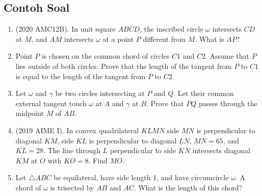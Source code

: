 \documentclass[11pt]{scrartcl}
\begin{document}
\subsection{Contoh Soal}
\begin{enumerate}
    \item (2020 AMC12B). In unit square $ABCD$, the inscribed circle $\omega$ intersects $CD$ at $M$, and $AM$ intersects $\omega$ at a point $P$ different from $M$. What is $AP$?
\item Point $P$ is chosen on the common chord of circles $C1$ and $C2$. Assume that $P$ lies outside of both circles. Prove that the length of the tangent from $P$ to $C1$ is equal to the length of the tangent from $P$ to $C2$.
\item Let $\omega$ and $\gamma$ be two circles intersecting at $P$ and $Q$. Let their common external tangent touch $\omega$ at $A$ and $\gamma$ at $B$. Prove that $PQ$ passes through the midpoint $M$ of $AB$.
\item (2019 AIME I). In convex quadrilateral $KLMN$ side $MN$ is perpendicular to diagonal $KM$, side $KL$ is perpendicular to diagonal $LN$, $MN = 65$, and $KL = 28$. The line through $L$ perpendicular to side $KN$ intersects diagonal $KM$ at $O$ with $KO = 8$. Find $MO$.
\item Let $\triangle ABC$ be equilateral, have side length 1, and have circumcircle $\omega$. A chord of $\omega$ is trisected by $AB$ and $AC$. What is the length of this chord?
 \end{enumerate}
\end{document}
